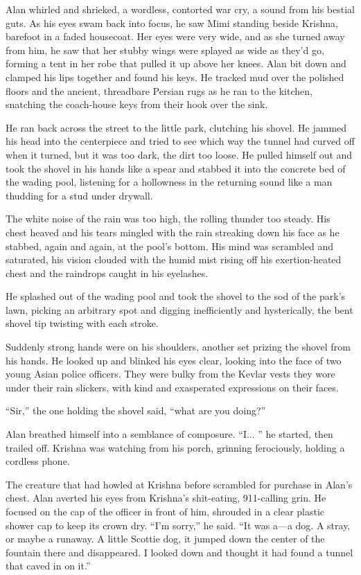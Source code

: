 Alan whirled and shrieked, a wordless, contorted war cry, a sound from
his bestial guts.  As his eyes swam back into focus, he saw Mimi
standing beside Krishna, barefoot in a faded housecoat.  Her eyes were
very wide, and as she turned away from him, he saw that her stubby
wings were splayed as wide as they'd go, forming a tent in her robe
that pulled it up above her knees.  Alan bit down and clamped his lips
together and found his keys.  He tracked mud over the polished floors
and the ancient, threadbare Persian rugs as he ran to the kitchen,
snatching the coach-house keys from their hook over the sink.

He ran back across the street to the little park, clutching his
shovel.  He jammed his head into the centerpiece and tried to see
which way the tunnel had curved off when it turned, but it was too
dark, the dirt too loose.  He pulled himself out and took the shovel
in his hands like a spear and stabbed it into the concrete bed of the
wading pool, listening for a hollowness in the returning sound like a
man thudding for a stud under drywall.

The white noise of the rain was too high, the rolling thunder too
steady.  His chest heaved and his tears mingled with the rain
streaking down his face as he stabbed, again and again, at the pool's
bottom.  His mind was scrambled and saturated, his vision clouded with
the humid mist rising off his exertion-heated chest and the raindrops
caught in his eyelashes.

He splashed out of the wading pool and took the shovel to the sod of
the park's lawn, picking an arbitrary spot and digging inefficiently
and hysterically, the bent shovel tip twisting with each stroke.

Suddenly strong hands were on his shoulders, another set prizing the
shovel from his hands.  He looked up and blinked his eyes clear,
looking into the face of two young Asian police officers.  They were
bulky from the Kevlar vests they wore under their rain slickers, with
kind and exasperated expressions on their faces.

``Sir,'' the one holding the shovel said, ``what are you doing?''

Alan breathed himself into a semblance of composure.  ``I...  '' he
started, then trailed off.  Krishna was watching from his porch,
grinning ferociously, holding a cordless phone.

The creature that had howled at Krishna before scrambled for purchase
in Alan's chest.  Alan averted his eyes from Krishna's shit-eating,
911-calling grin.  He focused on the cap of the officer in front of
him, shrouded in a clear plastic shower cap to keep its crown dry. 
``I'm sorry,'' he said.  ``It was a---a dog.  A stray, or maybe a
runaway.  A little Scottie dog, it jumped down the center of the
fountain there and disappeared.  I looked down and thought it had
found a tunnel that caved in on it.''

